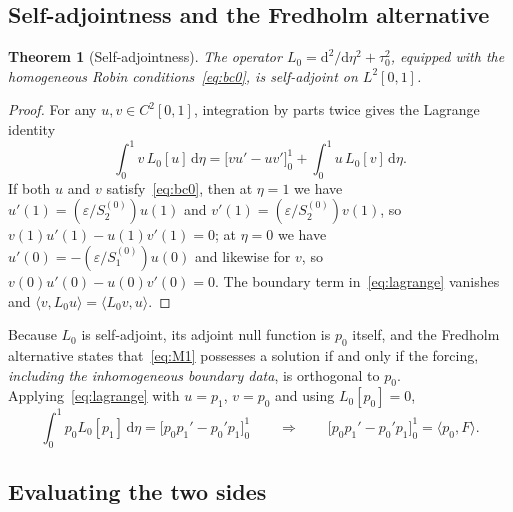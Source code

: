 \documentclass[11pt,a4paper]{article}
\newcommand{\eps}{\varepsilon}
\newcommand{\dd}{\mathrm{d}}
\theoremstyle{plain}
\newtheorem{theorem}{Theorem}[section]
\theoremstyle{remark}
\begin{document}
\subsection{Self-adjointness and the Fredholm alternative}\label{sec:solvability}

\begin{theorem}[Self-adjointness]\label{thm:sa}
The operator $L_0=\dd^2/\dd\eta^2+\tau_0^2$, equipped with the homogeneous Robin
conditions~\eqref{eq:bc0}, is self-adjoint on $L^2[0,1]$.
\end{theorem}

\begin{proof}
For any $u,v\in C^2[0,1]$, integration by parts twice gives the Lagrange identity
\begin{equation}
\int_0^1v\,L_0[u]\,\dd\eta=\bigl[vu'-uv'\bigr]_0^1+\int_0^1u\,L_0[v]\,\dd\eta .
\label{eq:lagrange}
\end{equation}
If both $u$ and $v$ satisfy~\eqref{eq:bc0}, then at $\eta=1$ we have $u'(1)=(\eps/S_2^{(0)})u(1)$ and
$v'(1)=(\eps/S_2^{(0)})v(1)$, so $v(1)u'(1)-u(1)v'(1)=0$; at $\eta=0$ we have
$u'(0)=-(\eps/S_1^{(0)})u(0)$ and likewise for $v$, so $v(0)u'(0)-u(0)v'(0)=0$. The boundary term
in~\eqref{eq:lagrange} vanishes and $\langle v,L_0u\rangle=\langle L_0v,u\rangle$.
\end{proof}

Because $L_0$ is self-adjoint, its adjoint null function is $p_0$ itself, and the Fredholm alternative
states that~\eqref{eq:M1} possesses a solution if and only if the forcing, \emph{including the
inhomogeneous boundary data}, is orthogonal to $p_0$. Applying~\eqref{eq:lagrange} with $u=p_1$,
$v=p_0$ and using $L_0[p_0]=0$,
\begin{equation}
\int_0^1p_0L_0[p_1]\,\dd\eta=\bigl[p_0p_1'-p_0'p_1\bigr]_0^1
\qquad\Longrightarrow\qquad
\bigl[p_0p_1'-p_0'p_1\bigr]_0^1=\langle p_0,F\rangle .
\label{eq:solv}
\end{equation}

\subsection{Evaluating the two sides}
\end{document}
